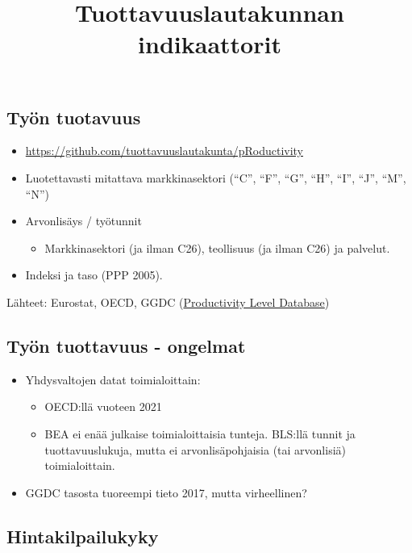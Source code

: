 \documentclass[
  letterpaper,
  DIV=11,
  numbers=noendperiod]{scrartcl}
\title{Tuottavuuslautakunnan indikaattorit}
\author{}
\date{}
\providecommand{\tightlist}{%
  \setlength{\itemsep}{0pt}\setlength{\parskip}{0pt}}\usepackage{longtable,booktabs,array}
\begin{document}
\maketitle


\subsection{Työn tuotavuus}\label{tyuxf6n-tuotavuus}

\begin{itemize}
\item
  \url{https://github.com/tuottavuuslautakunta/pRoductivity}
\item
  Luotettavasti mitattava markkinasektori (``C'', ``F'', ``G'', ``H'',
  ``I'', ``J'', ``M'', ``N'')
\item
  Arvonlisäys / työtunnit

  \begin{itemize}
  \tightlist
  \item
    Markkinasektori (ja ilman C26), teollisuus (ja ilman C26) ja
    palvelut.
  \end{itemize}
\item
  Indeksi ja taso (PPP 2005).
\end{itemize}

Lähteet: Eurostat, OECD, GGDC
(\href{https://www.rug.nl/ggdc/productivity/pld/}{Productivity Level
Database})~

\subsection{Työn tuottavuus -
ongelmat}\label{tyuxf6n-tuottavuus---ongelmat}

\begin{itemize}
\item
  Yhdysvaltojen datat toimialoittain:

  \begin{itemize}
  \item
    OECD:llä vuoteen 2021
  \item
    BEA ei enää julkaise toimialoittaisia tunteja. BLS:llä tunnit ja
    tuottavuuslukuja, mutta ei arvonlisäpohjaisia (tai arvonlisiä)
    toimialoittain.
  \end{itemize}
\item
  GGDC tasosta tuoreempi tieto 2017, mutta virheellinen?
\end{itemize}

\subsection{Hintakilpailukyky}\label{hintakilpailukyky}
\end{document}
